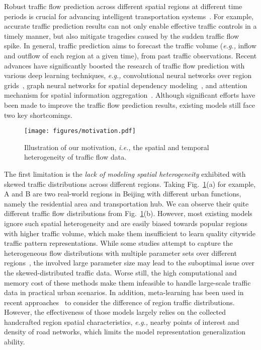\documentclass[letterpaper]{article} \usepackage{aaai23}  \usepackage{times}  \usepackage{helvet}  \usepackage{courier}  \usepackage[hyphens]{url}  \usepackage{graphicx} \urlstyle{rm} \def\UrlFont{\rm}  \usepackage{natbib}  \usepackage{caption} \frenchspacing  \setlength{\pdfpagewidth}{8.5in} \setlength{\pdfpageheight}{11in}
\newcommand{\ie}{\emph{i.e.,}\xspace}
\newcommand{\eg}{\emph{e.g.,}\xspace}
\newcommand{\figureautorefname}{Fig.}
\begin{document}
Robust traffic flow prediction across different spatial regions at different time periods is crucial for advancing intelligent transportation systems~\cite{zhang2020spatial}. For example, accurate traffic prediction results can not only enable effective traffic controls in a timely manner, but also mitigate tragedies caused by the sudden traffic flow spike. In general, traffic prediction aims to forecast the traffic volume (\eg inflow and outflow of each region at a given time), from past traffic observations. Recent advances have significantly boosted the research of traffic flow prediction with various deep learning techniques, \eg convolutional neural networks over region grids~\cite{zhang2017deep}, graph neural networks for spatial dependency modeling~\cite{zhang2021traffic}, and attention mechanism for spatial information aggregation~\cite{zheng2020gman}. Although significant efforts have been made to improve the traffic flow prediction results, existing models still face two key shortcomings.





\begin{figure}[t]
    \centering
    \texttt{[image: figures/motivation.pdf]}\vspace{-0.2cm}
    \caption{Illustration of our motivation, \ie the spatial and temporal heterogeneity of traffic flow data.}\vspace{-0.5cm}\label{fig:motivation}
\end{figure}

The first limitation is the \emph{lack of modeling spatial heterogeneity} exhibited with skewed traffic distributions across different regions. Taking \figureautorefname{~\ref{fig:motivation}}(a) for example, A and B are two real-world regions in Beijing with different urban functions, namely the residential area and transportation hub. We can observe their quite different traffic flow distributions from \figureautorefname{~\ref{fig:motivation}}(b). However, most existing models ignore such spatial heterogeneity and are easily biased towards popular regions with higher traffic volume, which make them insufficient to learn quality citywide traffic pattern representations. While some studies attempt to capture the heterogeneous flow distributions with multiple parameter sets over different regions~\cite{pan2019matrix, bai2020adaptive}, the involved large parameter size may lead to the suboptimal issue over the skewed-distributed traffic data. Worse still, the high computational and memory cost of these methods make them infeasible to handle large-scale traffic data in practical urban scenarios. In addition, meta-learning has been used in recent approaches~\cite{pan2019urban, ye2022meta} to consider the difference of region traffic distributions. However, the effectiveness of those models largely relies on the collected handcrafted region spatial characteristics, \eg nearby points of interest and density of road networks, which limits the model representation generalization ability.
\end{document}
